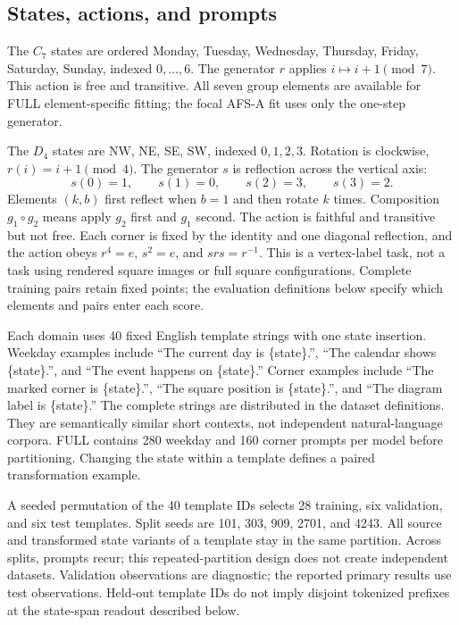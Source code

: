 \subsection{States, actions, and prompts}

The $C_7$ states are ordered Monday, Tuesday, Wednesday,
Thursday, Friday, Saturday, Sunday, indexed $0,\ldots,6$.
The generator $r$ applies $i\mapsto i+1\pmod7$.
This action is free and transitive.
All seven group elements are available for FULL
element-specific fitting; the focal AFS-A fit uses only
the one-step generator.

The $D_4$ states are NW, NE, SE, SW, indexed $0,1,2,3$.
Rotation is clockwise, $r(i)=i+1\pmod4$.
The generator $s$ is reflection across the vertical axis:
\[
 s(0)=1,\qquad s(1)=0,\qquad s(2)=3,\qquad s(3)=2.
\]
Elements $(k,b)$ first reflect when $b=1$ and then rotate
$k$ times.
Composition $g_1\circ g_2$ means apply $g_2$ first and
$g_1$ second.
The action is faithful and transitive but not free.
Each corner is fixed by the identity and one diagonal
reflection, and the action obeys
$r^4=e$, $s^2=e$, and $srs=r^{-1}$.
This is a vertex-label task, not a task using rendered square
images or full square configurations.
Complete training pairs retain fixed points; the evaluation
definitions below specify which elements and pairs enter
each score.

Each domain uses 40 fixed English template strings with one
state insertion.
Weekday examples include
``The current day is \{state\}.'',
``The calendar shows \{state\}.'', and
``The event happens on \{state\}.''
Corner examples include
``The marked corner is \{state\}.'',
``The square position is \{state\}.'', and
``The diagram label is \{state\}.''
The complete strings are distributed in the dataset definitions.
They are semantically similar short contexts, not independent
natural-language corpora.
FULL contains 280 weekday and 160 corner prompts per model
before partitioning.
Changing the state within a template defines a paired
transformation example.

A seeded permutation of the 40 template IDs selects
28 training, six validation, and six test templates.
Split seeds are 101, 303, 909, 2701, and 4243.
All source and transformed state variants of a template stay
in the same partition.
Across splits, prompts recur; this repeated-partition design
does not create independent datasets.
Validation observations are diagnostic; the reported primary
results use test observations.
Held-out template IDs do not imply disjoint tokenized prefixes
at the state-span readout described below.

